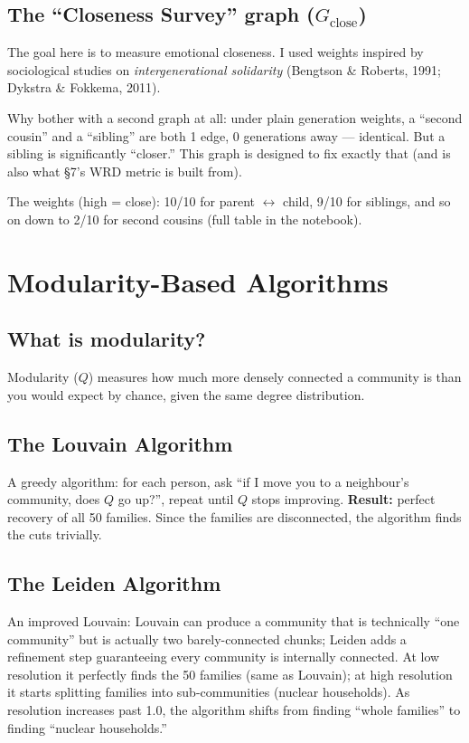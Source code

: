 \documentclass[11pt,a4paper]{article}
\begin{document}
\subsection{The ``Closeness Survey'' graph (\texorpdfstring{$G_{\text{close}}$}{G\_close})}

The goal here is to measure emotional closeness. I used weights inspired
by sociological studies on \emph{intergenerational solidarity} (Bengtson
\& Roberts, 1991; Dykstra \& Fokkema, 2011).

Why bother with a second graph at all: under plain generation weights, a
``second cousin'' and a ``sibling'' are both 1 edge, 0 generations away
--- identical. But a sibling is significantly ``closer.'' This graph is
designed to fix exactly that (and is also what \S7's WRD metric is built
from).

The weights (high = close): 10/10 for parent $\leftrightarrow$ child,
9/10 for siblings, and so on down to 2/10 for second cousins (full table
in the notebook).

\section{Modularity-Based Algorithms}

\subsection{What is modularity?}

Modularity ($Q$) measures how much more densely connected a community is
than you would expect by chance, given the same degree distribution.

\subsection{The Louvain Algorithm}

A greedy algorithm: for each person, ask ``if I move you to a neighbour's
community, does $Q$ go up?'', repeat until $Q$ stops improving.
\textbf{Result:} perfect recovery of all 50 families. Since the families
are disconnected, the algorithm finds the cuts trivially.

\subsection{The Leiden Algorithm}

An improved Louvain: Louvain can produce a community that is technically
``one community'' but is actually two barely-connected chunks; Leiden
adds a refinement step guaranteeing every community is internally
connected. At low resolution it perfectly finds the 50 families (same as
Louvain); at high resolution it starts splitting families into
sub-communities (nuclear households). As resolution increases past 1.0,
the algorithm shifts from finding ``whole families'' to finding
``nuclear households.''
\end{document}
